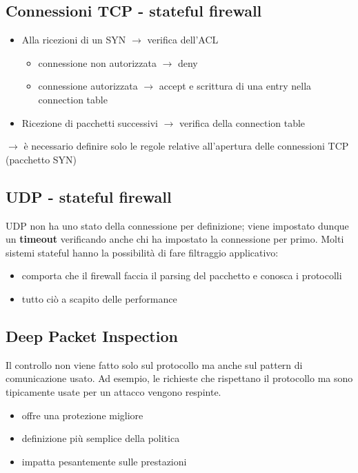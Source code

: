 \subsection{Connessioni TCP - stateful firewall}
\begin{itemize}
    \item Alla ricezioni di un SYN $\rightarrow$ verifica dell'ACL
    \begin{itemize}
        \item connessione non autorizzata $\rightarrow$ deny 
        \item connessione autorizzata $\rightarrow$ accept e scrittura di una entry nella connection table 
    \end{itemize}
    \item Ricezione di pacchetti successivi $\rightarrow$ verifica della connection table
\end{itemize}

\noindent $\rightarrow$ è necessario definire solo le regole relative all'apertura delle 
connessioni TCP (pacchetto SYN)

\subsection{UDP - stateful firewall}
UDP non ha uno stato della connessione per definizione; viene impostato dunque un \textbf{timeout}
verificando anche chi ha impostato la connessione per primo.
\noindent Molti sistemi stateful hanno la possibilità di fare filtraggio applicativo:
\begin{itemize}
    \item comporta che il firewall faccia il parsing del pacchetto e conosca i protocolli 
    \item tutto ciò a scapito delle performance
\end{itemize}

\subsection{Deep Packet Inspection}
Il controllo non viene fatto solo sul protocollo ma anche sul pattern di comunicazione usato. Ad 
esempio, le richieste che rispettano il protocollo ma sono tipicamente usate per un attacco vengono respinte.
\begin{itemize}
    \item offre una protezione migliore
    \item definizione più semplice della politica 
    \item impatta pesantemente sulle prestazioni
\end{itemize}


